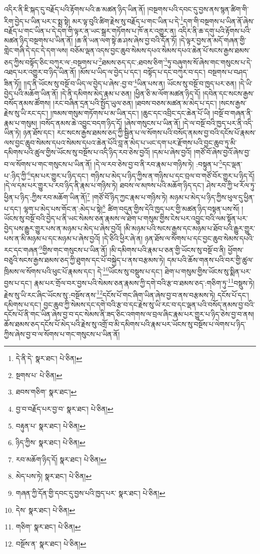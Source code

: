 འདིར་ནི་ཇི་སྐད་དུ་བརྗོད་པའི་རྟོགས་པའི་ཆ་མཚན་ཉིད་ཡིན་ནོ། །བསྔགས་པའི་དབང་དུ་བྱས་ནས་སྙན་ཚིག་གི་རིག་བྱེད་པ་ཡིན་པར་ང་སྨྲ་སྟེ། མར་ལྟ་བུའི་ཚིག་རྗེས་སུ་བརྗོད་པ་གང་ཡིན་པ་དེ་\footnote{དེ་ནི་དེ་  སྣར་ཐང་།  པེ་ཅིན། }དག་གི་བསྔགས་པ་ཡིན་ནོ་ཞེས་བརྗོད་པ་གང་ཡིན་པ་དེ་དག་གི་ལྟར་ན་ཡང་སྒྲར་གཏོགས་པ་ཁོ་ནར་འགྱུར་ན། འདིར་ནི་ཆ་དགུ་པའི་རྟོགས་པའི་མཚན་ཉིད་བསྔགས་པ་ཡིན་ནོ། །ཆ་ནི་ཡན་ལག་སྟེ་ཆ་ཤས་ཞེས་བྱ་བའི་དོན་ཏོ། །དེ་ལྟར་བྱས་ན་མདོ་གཞན་གྱི་གླེང་གཞི་དེ་དང་དེ་དག་ལས། བཅོམ་ལྡན་འདས་བྱང་ཆུབ་སེམས་དཔའ་སེམས་དཔའ་ཆེན་པོ་སངས་རྒྱས་ཐམས་ཅད་ཀྱིས་བསྟོད་ཅིང་བཀུར་ལ་:བསྔགས་པ་\footnote{སྔགས་པ་  པེ་ཅིན། }ཐམས་ཅད་དང་:ཐབས་ཅིག་\footnote{ཐབས་གཅིག་  སྣར་ཐང་། }ཏུ་བཞུགས་སོ་ཞེས་གང་གསུངས་པ་དེ་འཐད་པར་འགྱུར་བ་ཉིད་ཡིན་ནོ། །མོས་པ་ཡིད་ལ་བྱེད་པ་དང་། བསྟོད་པ་དང་བཀུར་བ་དང་། བསྔགས་པ་བཤད་ཟིན་ཏོ།། །།ད་ནི་ཡོངས་སུ་བསྔོ་བ་ཡིད་ལ་བྱེད་པ་ཞེས་:བྱ་བ་\footnote{བྱ་བ་བརྗོད་པར་བྱ་བ་  སྣར་ཐང་།  པེ་ཅིན། }ཡིན་པས་ན། ཡོངས་སུ་བསྔོ་བ་ཁྱད་པར་ཅན། །དེ་ཡི་བྱེད་པའི་མཆོག་ཡིན་ནོ། །དེ་ནི་དམིགས་མེད་རྣམ་པ་ཅན། །ཕྱིན་ཅི་མ་ལོག་མཚན་ཉིད་དོ། །དབེན་དང་སངས་རྒྱས་བསོད་ནམས་ཚོགས། །རང་བཞིན་དྲན་པའི་སྤྱོད་ཡུལ་ཅན། །ཐབས་བཅས་མཚན་མ་མེད་པ་དང་། །སངས་རྒྱས་རྗེས་སུ་ཡི་རང་དང་། །ཁམས་གསུམ་གཏོགས་པ་མ་ཡིན་དང་། །ཆུང་དང་འབྲིང་དང་ཆེན་པོ་ཡི། །བསྔོ་བ་གཞན་ནི་རྣམ་པ་གསུམ། །བསོད་ནམས་ཆེ་འབྱུང་བདག་ཉིད་དོ། །ཞེས་གསུངས་པ་ཡིན་ནོ། །དེ་ལ་བསྔོ་བའི་ཁྱད་པར་ནི་འདི་ཡིན་ཏེ། ཉན་ཐོས་དང་། རང་སངས་རྒྱས་ཐམས་ཅད་ཀྱི་སྦྱིན་པ་ལ་སོགས་པའི་བསོད་ནམས་བྱ་བའི་དངོས་པོ་རྣམས་ལས་བྱང་ཆུབ་སེམས་དཔའ་སེམས་དཔའ་ཆེན་པོའི་བླ་ན་མེད་པ་ཡང་དག་པར་རྫོགས་པའི་བྱང་ཆུབ་ཏུ་མི་དམིགས་པའི་ཚུལ་གྱིས་ཡོངས་སུ་བསྔོས་པ་འདི་ཉིད་རབ་ཅེས་བྱའོ། །དམ་པ་ཞེས་བྱའོ། །གཙོ་བོ་ཞེས་བྱའོ་ཞེས་བྱ་བ་ལ་སོགས་པ་གང་གསུངས་པ་ཡིན་ནོ། །དེ་ལ་རབ་ཅེས་བྱ་བ་ནི་རབ་རྣམ་པ་གཉིས་ཏེ། :བསྟུན་པ་\footnote{བརྟུན་པ་  སྣར་ཐང་།  པེ་ཅིན། }དང་ལྡན་པ་:ཉིད་ཀྱི་\footnote{ཉིད་ཀྱིས་  སྣར་ཐང་།  པེ་ཅིན། }དམ་པར་གྱུར་པ་ཉིད་དང་། གཉིས་པ་མེད་པ་ཉིད་ཀྱིས་ན་གཉིས་པ་དང་བྲལ་བ་གཙོ་བོར་གྱུར་པ་ཉིད་དོ། །དེ་ལ་དམ་པར་གྱུར་པ་རབ་ཉིད་ནི་རྣམ་པ་གཉིས་ཏེ། ཐབས་ལ་མཁས་པའི་མཆོག་ཉིད་དང་། ཤེས་རབ་ཀྱི་ཕ་རོལ་ཏུ་ཕྱིན་པ་ཉིད་:ཀྱིས་རབ་མཆོག་ཡིན་ནོ།\footnote{རབ་མཆོག་ཉིད་དོ།  སྣར་ཐང་།  པེ་ཅིན། } །གཙོ་བོ་ཉིད་ཀྱང་རྣམ་པ་གཉིས་ཏེ། མཉམ་པ་མེད་པ་ཉིད་ཀྱིས་ཕུལ་དུ་ཕྱིན་པ་དང་། ལྷག་པ་མེད་པས་གོང་ན་:མེད་པ་སྟེ།\footnote{མེད་པས་ཏེ།  སྣར་ཐང་།  པེ་ཅིན། } ཚིག་བདུན་གྱིས་དེའི་ཁྱད་པར་གྱི་མཚན་ཉིད་བསྟན་པས་སོ། །ཡོངས་སུ་བསྔོ་བའི་བྱེད་པ་ནི་ཡང་སེམས་ཅན་རྣམས་ལ་ཐེག་པ་གསུམ་གྱིས་ངེས་པར་འབྱུང་བའི་ལམ་སྟོན་པར་བྱེད་པས་རྒྱུར་གྱུར་པས་ན་མཉམ་པ་མེད་པ་ཞེས་བྱའོ། །མི་མཉམ་པའི་སངས་རྒྱས་དང་མཉམ་པ་ཐོབ་པའི་རྒྱུར་གྱུར་པས་ན་མི་མཉམ་པ་དང་མཉམ་པ་ཞེས་བྱའོ། །དེ་ཅིའི་ཕྱིར་ཞེ་ན། ཉན་ཐོས་ལ་སོགས་པ་དང་བྱང་ཆུབ་སེམས་དཔའི་རང་དང་གཞན་\footnote{གཞན་ཀྱི་དོན་གྱི་དབང་དུ་བྱས་པའི་ཁྱད་པར་  སྣར་ཐང་།  པེ་ཅིན། }གྱིས་གང་གསུངས་པ་ཡིན་ནོ། །མི་དམིགས་པའི་རྣམ་པ་ཅན་གྱི་ཡོངས་སུ་བསྔོ་བ་ནི། ཕྱོགས་བཅུའི་སངས་རྒྱས་ཐམས་ཅད་ཀྱི་ཐུགས་དང་པོ་བསྐྱེད་པ་ནས་བརྩམས་ཏེ། དམ་པའི་ཆོས་གནས་པའི་བར་གྱི་ཚུལ་ཁྲིམས་ལ་སོགས་པའི་ཕུང་པོ་རྣམས་དང་། དེ་\footnote{དེས་  སྣར་ཐང་།  པེ་ཅིན། }ཡོངས་སུ་བསྡུས་པ་དང་། ཐེག་པ་གསུམ་གྱིས་ཡོངས་སུ་སྨིན་པར་བྱས་པ་དང་། རྣམ་པར་གྲོལ་བར་བྱས་པའི་སེམས་ཅན་རྣམས་ཀྱི་དགེ་བའི་རྩ་བ་ཐམས་ཅད་:གཅིག་ཏུ་\footnote{གཅིག་  སྣར་ཐང་།  པེ་ཅིན། }བསྡུས་ཏེ། རྗེས་སུ་ཡི་རང་ཞིང་ཡོངས་སུ་:བསྔོས་ནས་\footnote{བསྔོས་ན་  སྣར་ཐང་།  པེ་ཅིན། }དངོས་པོ་གང་ཞིག་ཡིན་ཞེས་བྱ་བ་ནས་བརྩམས་ཏེ། དངོས་པོ་དང་། དམིགས་པ་དང་། བྱང་ཆུབ་ཀྱི་སེམས་དང་དགེ་བའི་རྩ་བ་དང་རྗེས་སུ་ཡི་རང་བ་དང་ལྡན་པའི་བསོད་ནམས་བྱ་བའི་དངོས་པོ་ནི་གང་ཡིན་ཞེས་བྱ་བ་དང་སེམས་ནི་ཟད་ཅིང་འགགས་ལ་བྲལ་ཞིང་རྣམ་པར་གྱུར་པ་ཉིད་ཅེས་བྱ་བ་ནས། ཆོས་ཐམས་ཅད་དངོས་པོ་མེད་པའི་རྗེས་སུ་འགྲོ་བ་མི་དམིགས་པའི་རྣམ་པར་ཡོངས་སུ་བསྔོས་པ་ལེགས་པ་ཉིད་ཀྱིས་ཞེས་བྱ་བ་ལ་སོགས་པ་གང་གསུངས་པ་ཡིན་ནོ། 